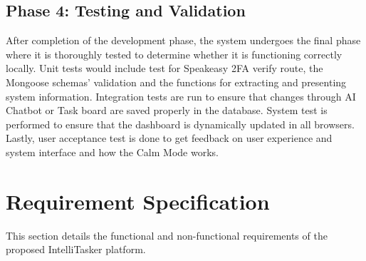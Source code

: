 \documentclass[conference]{IEEEtran}
\begin{document}
\subsection{Phase 4: Testing and Validation}
After completion of the development phase, the system undergoes the final phase where it is thoroughly tested to determine whether it is functioning correctly locally. Unit tests would include test for Speakeasy 2FA verify route, the Mongoose schemas' validation and the functions for extracting and presenting system information. Integration tests are run to ensure that changes through AI Chatbot or Task board are saved properly in the database. System test is performed to ensure that the dashboard is dynamically updated in all browsers. Lastly, user acceptance test is done to get feedback on user experience and system interface and how the Calm Mode works.

\section{Requirement Specification}
This section details the functional and non-functional requirements of the proposed IntelliTasker platform.
\end{document}
